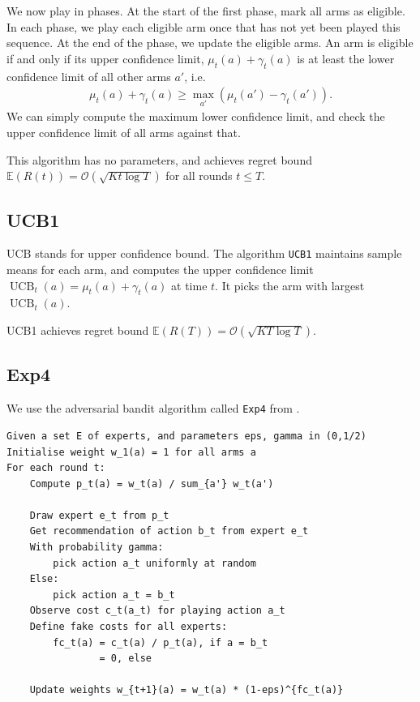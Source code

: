 \documentclass[10pt]{article}
\newcommand{\EE}{\mathbb{E}}
\newcommand{\bigoh}{\mathcal{O}}
\DeclareMathOperator{\UCB}{UCB}
\begin{document}
We now play in phases. At the start of the first phase, mark all arms as
eligible. In each phase, we play each eligible arm once that has not yet been
played this sequence. At the end of the phase, we update the eligible arms. An
arm is eligible if and only if its upper confidence limit, $\mu_t(a) +
\gamma_t(a)$ is at least the lower confidence limit of all other arms $a'$, i.e.
\begin{align*}
    \mu_t(a) + \gamma_t(a) \ge \max_{a'} (\mu_t(a') - \gamma_t(a')).
\end{align*}
We can simply compute the maximum lower confidence limit, and check the upper
confidence limit of all arms against that.

This algorithm has no parameters, and achieves regret bound $\EE(R(t)) =
\bigoh(\sqrt{K t \log T})$ for all rounds $t \le T$.

\subsection{UCB1}
UCB stands for upper confidence bound. The algorithm \verb'UCB1' maintains
sample means for each arm, and computes the upper confidence limit $\UCB_t(a) =
\mu_t(a) + \gamma_t(a)$ at time $t$. It picks the arm with largest $\UCB_t(a)$.

UCB1 achieves regret bound $\EE(R(T)) = \bigoh(\sqrt{K T \log T})$.

\subsection{Exp4}

We use the adversarial bandit algorithm called \verb'Exp4' from \cite{Slivkins}.

\begin{lstlisting}
Given a set E of experts, and parameters eps, gamma in (0,1/2)
Initialise weight w_1(a) = 1 for all arms a
For each round t:
    Compute p_t(a) = w_t(a) / sum_{a'} w_t(a')

    Draw expert e_t from p_t
    Get recommendation of action b_t from expert e_t
    With probability gamma:
        pick action a_t uniformly at random
    Else: 
        pick action a_t = b_t
    Observe cost c_t(a_t) for playing action a_t
    Define fake costs for all experts:
        fc_t(a) = c_t(a) / p_t(a), if a = b_t
                = 0, else

    Update weights w_{t+1}(a) = w_t(a) * (1-eps)^{fc_t(a)}
\end{lstlisting}
\end{document}

